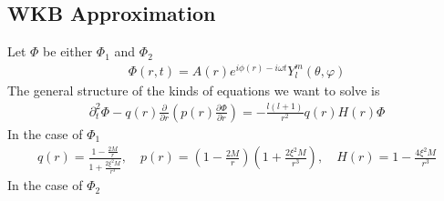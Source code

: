 \documentclass[12pt]{article}
\begin{document}














\subsection{WKB Approximation}
Let $\Phi$ be either $\Phi_{1}$ and $\Phi_{2}$  
\begin{gather}
\Phi(r,t)
=
A(r)
e^{i \phi(r) - i \omega t}
Y_{l}^{m}(\theta, \varphi)
\end{gather}
The general structure of the kinds of equations we want to solve is
\begin{gather}
\partial_{t}^{2}
\Phi
-
q(r)
\frac{\partial}{\partial r}
\left(
p(r)
\frac{\partial \Phi}{\partial r}
\right)
=
-
\frac{l (l +1)}{r^{2}}
q(r) H(r)
\Phi
\end{gather}
In the case of $\Phi_{1}$
\begin{gather}
q(r)
=
\frac{1 - \frac{2 M}{r}}{1 + \frac{2 \xi^{2} M}{r^{3}}}
,
\quad
p(r)
=
(1 - \frac{2 M}{r})
(1 + \frac{2 \xi^{2} M}{r^{3}})
,
\quad
H(r)
=
1
-
\frac{4 \xi^{2} M}{r^{3}}
\end{gather}
In the case of $\Phi_{2}$
\end{document}
